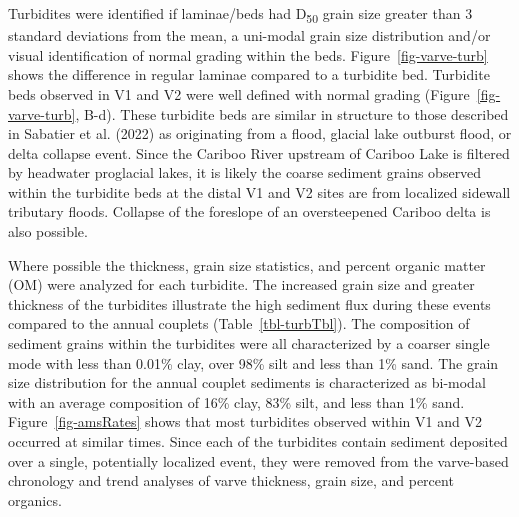 \documentclass[
  letterpaper,
  DIV=11,
  numbers=noendperiod]{scrartcl}
\begin{document}
Turbidites were identified if laminae/beds had D\textsubscript{50} grain
size greater than 3 standard deviations from the mean, a uni-modal grain
size distribution and/or visual identification of normal grading within
the beds. Figure~\ref{fig-varve-turb} shows the difference in regular
laminae compared to a turbidite bed. Turbidite beds observed in V1 and
V2 were well defined with normal grading (Figure~\ref{fig-varve-turb},
B-d). These turbidite beds are similar in structure to those described
in Sabatier et al. (2022) as originating from a flood, glacial lake
outburst flood, or delta collapse event. Since the Cariboo River
upstream of Cariboo Lake is filtered by headwater proglacial lakes, it
is likely the coarse sediment grains observed within the turbidite beds
at the distal V1 and V2 sites are from localized sidewall tributary
floods. Collapse of the foreslope of an oversteepened Cariboo delta is
also possible.

Where possible the thickness, grain size statistics, and percent organic
matter (OM) were analyzed for each turbidite. The increased grain size
and greater thickness of the turbidites illustrate the high sediment
flux during these events compared to the annual couplets
(Table~\ref{tbl-turbTbl}). The composition of sediment grains within the
turbidites were all characterized by a coarser single mode with less
than 0.01\% clay, over 98\% silt and less than 1\% sand. The grain size
distribution for the annual couplet sediments is characterized as
bi-modal with an average composition of 16\% clay, 83\% silt, and less
than 1\% sand. Figure~\ref{fig-amsRates} shows that most turbidites
observed within V1 and V2 occurred at similar times. Since each of the
turbidites contain sediment deposited over a single, potentially
localized event, they were removed from the varve-based chronology and
trend analyses of varve thickness, grain size, and percent organics.
\end{document}
